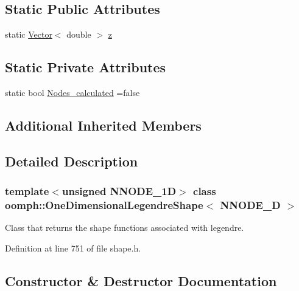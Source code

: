 \subsection*{Static Public Attributes}
\begin{DoxyCompactItemize}
\item 
static \hyperlink{classoomph_1_1Vector}{Vector}$<$ double $>$ \hyperlink{classoomph_1_1OneDimensionalLegendreShape_ab2d2b8418ac85a8ebf643d365fd52678}{z}
\end{DoxyCompactItemize}
\subsection*{Static Private Attributes}
\begin{DoxyCompactItemize}
\item 
static bool \hyperlink{classoomph_1_1OneDimensionalLegendreShape_ac10397bf5b832aa567e4114d8e9a5795}{Nodes\+\_\+calculated} =false
\end{DoxyCompactItemize}
\subsection*{Additional Inherited Members}


\subsection{Detailed Description}
\subsubsection*{template$<$unsigned N\+N\+O\+D\+E\+\_\+1D$>$\newline
class oomph\+::\+One\+Dimensional\+Legendre\+Shape$<$ N\+N\+O\+D\+E\+\_\+D $>$}

Class that returns the shape functions associated with legendre. 

Definition at line 751 of file shape.\+h.



\subsection{Constructor \& Destructor Documentation}
\mbox{\label{classoomph_1_1OneDimensionalLegendreShape_a33933deb41c936585bee8f844bf820e4}} 
